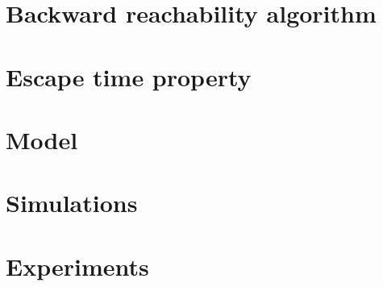 \documentclass[electronic]{kthesis}
\newcommand{\vect}[1]{\ensuremath{ \mathbf{#1}}}
\theoremstyle{named}
\begin{document}
\chapter{Backward reachability algorithm}

%
\chapter{Escape time property}

%
%
\chapter{Model}
\newcommand{\um}{\u_{-}}
\newcommand{\up}{\u_{+}}
\newcommand{\uo}{\vect{0}}


\chapter{Simulations}






\chapter{Experiments}




%
%
\end{document}

